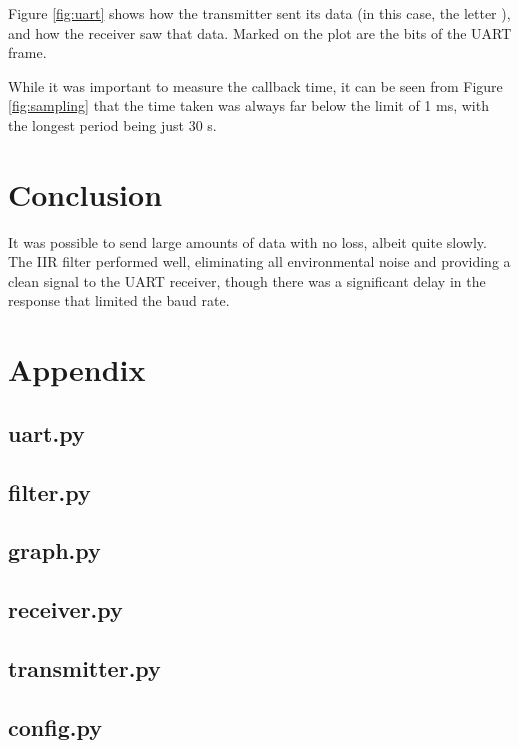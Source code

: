 \documentclass{article}
\begin{document}
\begin{multicols}{2}
Figure \ref{fig:uart} shows how the transmitter sent its data (in this case, the letter ), and how the receiver saw that data. Marked on the plot are the bits of the UART frame.

While it was important to measure the callback time, it can be seen from Figure \ref{fig:sampling} that the time taken was always far below the limit of 1 ms, with the longest period being just 30 \textmu s.

\section{Conclusion}
It was possible to send large amounts of data with no loss, albeit quite slowly. The IIR filter performed well, eliminating all environmental noise and providing a clean signal to the UART receiver, though there was a significant delay in the response that limited the baud rate.

\end{multicols}
\pagebreak

\section{Appendix}

\subsection{uart.py}


\subsection{filter.py}


\subsection{graph.py}


\subsection{receiver.py}


\subsection{transmitter.py}


\subsection{config.py}

\end{document}
